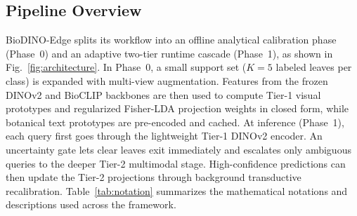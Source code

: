 \documentclass[preprint,12pt]{elsarticle}
\begin{document}
\subsection{Pipeline Overview}
\label{sec:system_architecture}
BioDINO-Edge splits its workflow into an offline analytical calibration phase (Phase~0) and an adaptive two-tier runtime cascade (Phase~1), as shown in Fig.~\ref{fig:architecture}. In Phase~0, a small support set ($K = 5$ labeled leaves per class) is expanded with multi-view augmentation. Features from the frozen DINOv2 and BioCLIP backbones are then used to compute Tier-1 visual prototypes and regularized Fisher-LDA projection weights in closed form, while botanical text prototypes are pre-encoded and cached. At inference (Phase~1), each query first goes through the lightweight Tier-1 DINOv2 encoder. An uncertainty gate lets clear leaves exit immediately and escalates only ambiguous queries to the deeper Tier-2 multimodal stage. High-confidence predictions can then update the Tier-2 projections through background transductive recalibration. Table~\ref{tab:notation} summarizes the mathematical notations and descriptions used across the framework.
\end{document}
